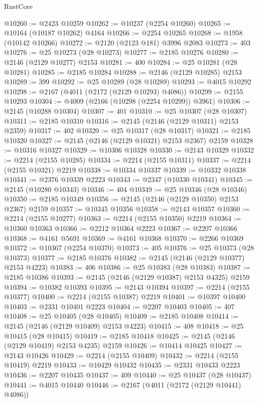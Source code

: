\begin{lexlean}{RustCore}
\begin{coremodule}
@10260 := @2423 @10259
@10262 := @10237 (@2254 @10260)
@10265 := @10164 (@10187 @10262) @4164
@10266 := @2254 @10265
@10268 := @1958 (@10142 @10266)
@10272 := @2120 (@2123 @181) @3996 @2083
@10273 := 403
@10276 := @25 @10273 (@28 @10273)
@10277 := @2185 @10276
@10280 := @2146 (@2129 @10277) @2153
@10281 := 400
@10284 := @25 @10281 (@28 @10281)
@10285 := @2185 @10284
@10288 := @2146 (@2129 @10285) @2153
@10289 := 399
@10292 := @25 @10289 (@28 @10289)
@10293 := @4015 @10292
@10298 := @2167 (@4011 (@2172 (@2129 @10293) @4086))
@10299 := @2155 @10293
@10304 := @4009 (@2166 (@10298 (@2254 @10299)) @3961)
@10306 := @2145 (@10288 @10304)
@10307 := 401
@10310 := @25 @10307 (@28 @10307)
@10311 := @2185 @10310
@10316 := @2145 (@2146 (@2129 @10311) @2153 @2359)
@10317 := 402
@10320 := @25 @10317 (@28 @10317)
@10321 := @2185 @10320
@10327 := @2145 (@2146 (@2129 @10321) @2153 @2367) @2159
@10328 := @10316 @10327
@10329 := @10306 @10328
@10330 := @2143 @10329
@10332 := @2214 (@2155 @10285)
@10334 := @2214 (@2155 @10311)
@10337 := @2214 (@2155 @10321) @2219
@10338 := @10334 @10337
@10339 := @10332 @10338
@10341 := @2376 @10339 @2223
@10343 := @2347 (@10330 @10341)
@10345 := @2145 (@10280 @10343)
@10346 := 404
@10349 := @25 @10346 (@28 @10346)
@10350 := @2185 @10349
@10356 := @2145 (@2146 (@2129 @10350) @2153 @2367) @2159
@10357 := @10345 @10356
@10358 := @2143 @10357
@10360 := @2214 (@2155 @10277)
@10363 := @2214 (@2155 @10350) @2219
@10364 := @10360 @10363
@10366 := @2212 @10364 @2223
@10367 := @2207 @10366
@10368 := @4161 @5691
@10369 := @4161 @10368
@10370 := @2266 @10369
@10372 := @10367 (@2254 @10370)
@10373 := 405
@10376 := @25 @10373 (@28 @10373)
@10377 := @2185 @10376
@10382 := @2145 (@2146 (@2129 @10377) @2153 @4223)
@10383 := 406
@10386 := @25 @10383 (@28 @10383)
@10387 := @2185 @10386
@10393 := @2145 (@2146 (@2129 @10387) @2153 @4325) @2159
@10394 := @10382 @10393
@10395 := @2143 @10394
@10397 := @2214 (@2155 @10377)
@10400 := @2214 (@2155 @10387) @2219
@10401 := @10397 @10400
@10403 := @2331 @10401 @2223
@10404 := @2207 @10403
@10405 := 407
@10408 := @25 @10405 (@28 @10405)
@10409 := @2185 @10408
@10414 := @2145 (@2146 (@2129 @10409) @2153 @4223)
@10415 := 408
@10418 := @25 @10415 (@28 @10415)
@10419 := @2185 @10418
@10425 := @2145 (@2146 (@2129 @10419) @2153 @4235) @2159
@10426 := @10414 @10425
@10427 := @2143 @10426
@10429 := @2214 (@2155 @10409)
@10432 := @2214 (@2155 @10419) @2219
@10433 := @10429 @10432
@10435 := @2331 @10433 @2223
@10436 := @2207 @10435
@10437 := 409
@10440 := @25 @10437 (@28 @10437)
@10441 := @4015 @10440
@10446 := @2167 (@4011 (@2172 (@2129 @10441) @4086))

\end{coremodule}
\end{lexlean}
